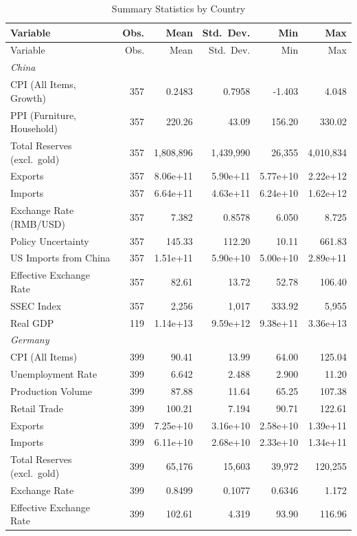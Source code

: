 \begin{longtable}{lrrrrr}
\caption{Summary Statistics by Country} \label{tab:data_stat_all} \\
\toprule
Variable & Obs. & Mean & Std.\ Dev. & Min & Max \\
\midrule
\endfirsthead
\toprule
Variable & Obs. & Mean & Std.\ Dev. & Min & Max \\
\midrule
\endhead
\bottomrule
\endfoot
\textit{China} & & & & & \\
CPI (All Items, Growth) & 357 & 0.2483 & 0.7958 & -1.403 & 4.048 \\
PPI (Furniture, Household) & 357 & 220.26 & 43.09 & 156.20 & 330.02 \\
Total Reserves (excl.\ gold) & 357 & 1,808,896 & 1,439,990 & 26,355 & 4,010,834 \\
Exports & 357 & 8.06e+11 & 5.90e+11 & 5.77e+10 & 2.22e+12 \\
Imports & 357 & 6.64e+11 & 4.63e+11 & 6.24e+10 & 1.62e+12 \\
Exchange Rate (RMB/USD) & 357 & 7.382 & 0.8578 & 6.050 & 8.725 \\
Policy Uncertainty & 357 & 145.33 & 112.20 & 10.11 & 661.83 \\
US Imports from China & 357 & 1.51e+11 & 5.90e+10 & 5.00e+10 & 2.89e+11 \\
Effective Exchange Rate & 357 & 82.61 & 13.72 & 52.78 & 106.40 \\
SSEC Index & 357 & 2,256 & 1,017 & 333.92 & 5,955 \\
Real GDP & 119 & 1.14e+13 & 9.59e+12 & 9.38e+11 & 3.36e+13 \\
\addlinespace
\textit{Germany} & & & & & \\
CPI (All Items) & 399 & 90.41 & 13.99 & 64.00 & 125.04 \\
Unemployment Rate & 399 & 6.642 & 2.488 & 2.900 & 11.20 \\
Production Volume & 399 & 87.88 & 11.64 & 65.25 & 107.38 \\
Retail Trade & 399 & 100.21 & 7.194 & 90.71 & 122.61 \\
Exports & 399 & 7.25e+10 & 3.16e+10 & 2.58e+10 & 1.39e+11 \\
Imports & 399 & 6.11e+10 & 2.68e+10 & 2.33e+10 & 1.34e+11 \\
Total Reserves (excl.\ gold) & 399 & 65,176 & 15,603 & 39,972 & 120,255 \\
Exchange Rate & 399 & 0.8499 & 0.1077 & 0.6346 & 1.172 \\
Effective Exchange Rate & 399 & 102.61 & 4.319 & 93.90 & 116.96 \\

\end{longtable}

